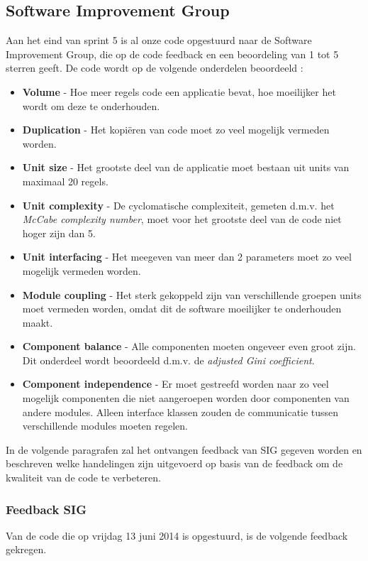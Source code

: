 \subsection{Software Improvement Group}
Aan het eind van sprint 5 is al onze code opgestuurd naar de Software Improvement Group, die op de code feedback en een beoordeling van 1 tot 5 sterren geeft. De code wordt op de volgende onderdelen beoordeeld \cite{sigmanual}:
\begin{itemize}
\item \textbf{Volume} - Hoe meer regels code een applicatie bevat, hoe moeilijker het wordt om deze te onderhouden.
\item \textbf{Duplication} - Het kopi\"eren van code moet zo veel mogelijk vermeden worden.
\item \textbf{Unit size} - Het grootste deel van de applicatie moet bestaan uit units van maximaal 20 regels.
\item \textbf{Unit complexity} - De cyclomatische complexiteit, gemeten d.m.v. het \emph{McCabe complexity number}, moet voor het grootste deel van de code niet hoger zijn dan 5.
\item \textbf{Unit interfacing} - Het meegeven van meer dan 2 parameters moet zo veel mogelijk vermeden worden.
\item \textbf{Module coupling} - Het sterk gekoppeld zijn van verschillende groepen units moet vermeden worden, omdat dit de software moeilijker te onderhouden maakt.
\item \textbf{Component balance} - Alle componenten moeten ongeveer even groot zijn. Dit onderdeel wordt beoordeeld d.m.v. de \emph{adjusted Gini coefficient}.
\item \textbf{Component independence} - Er moet gestreefd worden naar zo veel mogelijk componenten die niet aangeroepen worden door componenten van andere modules. Alleen interface klassen zouden de communicatie tussen verschillende modules moeten regelen.
\end{itemize}

In de volgende paragrafen zal het ontvangen feedback van SIG gegeven worden en beschreven welke handelingen zijn uitgevoerd op basis van de feedback om de kwaliteit van de code te verbeteren.

\subsubsection{Feedback SIG}
Van de code die op vrijdag 13 juni 2014 is opgestuurd, is de volgende feedback gekregen.

